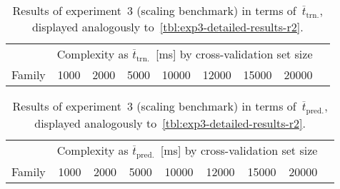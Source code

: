 \begin{table}[!hbt]
	\centering
	\setlength\tabcolsep{5pt}
	{\scriptsize
		\begin{tabular}{lrrrrrrrr}
		\toprule
		{} & \multicolumn{7}{c}{Complexity as $\overline{t}_{\text{trn.}}$~[\si{\milli\second}] by cross-validation set size}\\
		\cmidrule(lr){2-8}
		Family
						& \num{1000}
						& \num{2000}
						& \num{5000}
						& \num{10000}
						& \num{12000}
						& \num{15000}
						& \num{20000}\\
		\midrule
		
		\bottomrule
		\end{tabular}
	}
	\caption{Results of experiment~3 (scaling benchmark) in ter\si{\milli\second} of~$\overline{t}_{\text{trn.}}$,
	displayed analogously to~\cref{tbl:exp3-detailed-results-r2}.}
	\label{tbl:exp3-detailed-results-t-train}
\end{table}


\begin{table}[!hbt]
	\centering
	\setlength\tabcolsep{5pt}
	{\scriptsize
		\begin{tabular}{lrrrrrrrr}
		\toprule
		{} & \multicolumn{7}{c}{Complexity as $\overline{t}_{\text{pred.}}$~[\si{\milli\second}] by cross-validation set size}\\
		\cmidrule(lr){2-8}
		Family
						& \num{1000}
						& \num{2000}
						& \num{5000}
						& \num{10000}
						& \num{12000}
						& \num{15000}
						& \num{20000}\\
		\midrule
		
		\bottomrule
		\end{tabular}
	}
	\caption{Results of experiment~3 (scaling benchmark) in ter\si{\milli\second} of~$\overline{t}_{\text{pred.}}$,
	displayed analogously to~\cref{tbl:exp3-detailed-results-r2}.}
	\label{tbl:exp3-detailed-results-t-pred}
\end{table}


